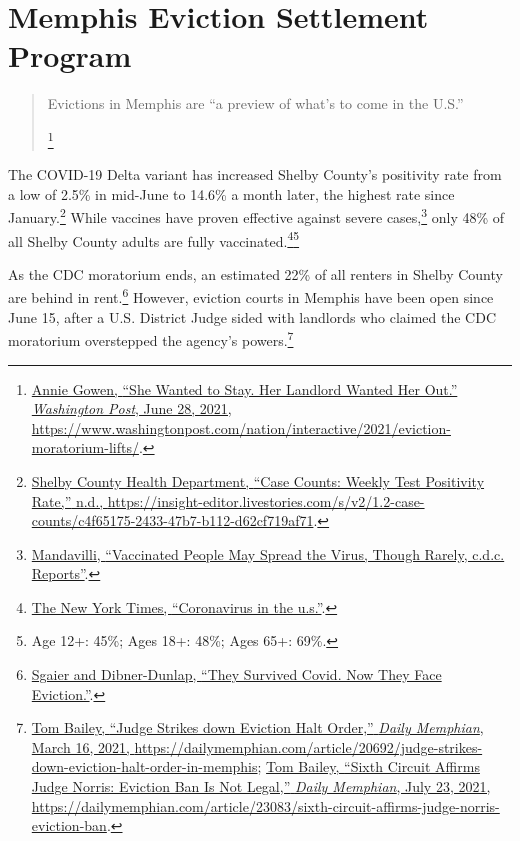 \documentclass[
  openany]{book}
\begin{document}
\hypertarget{memphis-eviction-settlement-program}{%
\section{Memphis Eviction Settlement Program}\label{memphis-eviction-settlement-program}}

\begin{quote}
Evictions in Memphis are ``a preview of what's to come in the U.S.''

\footnote{\protect\hyperlink{ref-gowen2021}{Annie Gowen, {``She Wanted to Stay. Her Landlord Wanted Her Out.''} \emph{Washington Post}, June 28, 2021, \url{https://www.washingtonpost.com/nation/interactive/2021/eviction-moratorium-lifts/}}.}
\end{quote}

The COVID-19 Delta variant has increased Shelby County's positivity rate from a low of 2.5\% in mid-June to 14.6\% a month later, the highest rate since January.\footnote{\protect\hyperlink{ref-shelbycountyhealthdepartment}{Shelby County Health Department, {``Case Counts: Weekly Test Positivity Rate,''} n.d., \url{https://insight-editor.livestories.com/s/v2/1.2-case-counts/c4f65175-2433-47b7-b112-d62cf719af71}}.} While vaccines have proven effective against severe cases,\footnote{\protect\hyperlink{ref-mandavilli2021}{Mandavilli, {``Vaccinated People May Spread the Virus, Though Rarely, c.d.c. Reports''}}.} only 48\% of all Shelby County adults are fully vaccinated.\footnote{\protect\hyperlink{ref-thenewyorktimes2020}{The New York Times, {``Coronavirus in the u.s.''}}.}\footnote{Age 12+: 45\%; Ages 18+: 48\%; Ages 65+: 69\%.}

As the CDC moratorium ends, an estimated 22\% of all renters in Shelby County are behind in rent.\footnote{\protect\hyperlink{ref-sgaier2021}{Sgaier and Dibner-Dunlap, {``They Survived Covid. Now They Face Eviction.''}}.} However, eviction courts in Memphis have been open since June 15, after a U.S. District Judge sided with landlords who claimed the CDC moratorium overstepped the agency's powers.\footnote{\protect\hyperlink{ref-bailey2021}{Tom Bailey, {``Judge Strikes down Eviction Halt Order,''} \emph{Daily Memphian}, March 16, 2021, \url{https://dailymemphian.com/article/20692/judge-strikes-down-eviction-halt-order-in-memphis}}; \protect\hyperlink{ref-bailey2021a}{Tom Bailey, {``Sixth Circuit Affirms Judge Norris: Eviction Ban Is Not Legal,''} \emph{Daily Memphian}, July 23, 2021, \url{https://dailymemphian.com/article/23083/sixth-circuit-affirms-judge-norris-eviction-ban}}.}
\end{document}
